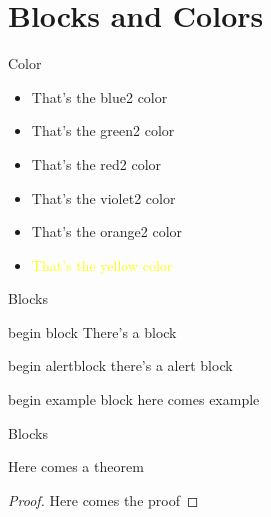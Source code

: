 \section{Blocks and Colors}
 \frame{\sectionpage}

\begin{frame}{Color}

\begin{itemize}
    \item \textcolor{blue2}{That's the blue2 color}
    \item \textcolor{green2}{That's the green2 color}
    \item \textcolor{red2}{That's the red2 color}
    \item \textcolor{violet2}{That's the violet2 color}
    \item \textcolor{orange2}{That's the orange2 color}
    \item \textcolor{yellow}{That's the yellow color}
\end{itemize}
    
\end{frame}

\begin{frame}{Blocks}
\begin{block}{begin block}
There's a block
\end{block}

\begin{alertblock}{begin alertblock}
    there's a alert block 
\end{alertblock}

\begin{exampleblock}{begin example block}
here comes example
\end{exampleblock} 

\end{frame}


\begin{frame}{Blocks}
    
\begin{theorem}
    Here comes a theorem
\end{theorem}

\begin{proof}
    Here comes the proof
\end{proof}


    
\end{frame}